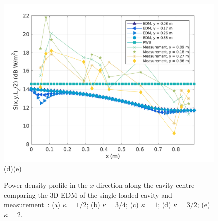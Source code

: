 \documentclass[a4paper]{article}
\numberwithin{equation}{section}
\begin{document}
\begin{figure}[ht]
\begin{center}
\includegraphics[width=0.49\linewidth]{figures/SDM_3D_SL_PowerDensityProfileXMeas_JX_k2_0}\\
{\footnotesize (d)\hspace{75mm}(e)}\\
\vspace{-2mm}
\caption{\label{fg:measprofsslk} Power density profile in the $x$-direction along the cavity centre comparing
the 3D EDM of the single loaded cavity and measurement~\citep{Flintoft2017b}: (a) $\kappa=1/2$; (b) $\kappa=3/4$;
(c) $\kappa=1$; (d) $\kappa=3/2$; (e) $\kappa=2$.}
\end{center}
\end{figure}
\end{document}
